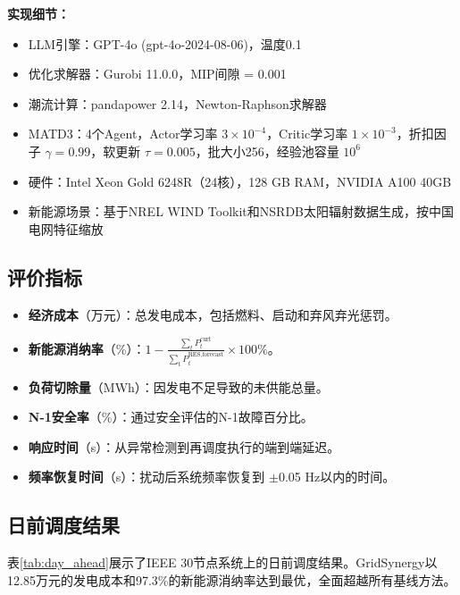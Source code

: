 \documentclass[conference]{IEEEtran}
\begin{document}
\textbf{实现细节：}
\begin{itemize}
    \item LLM引擎：GPT-4o (gpt-4o-2024-08-06)，温度0.1
    \item 优化求解器：Gurobi 11.0.0，MIP间隙 = 0.001
    \item 潮流计算：pandapower 2.14，Newton-Raphson求解器
    \item MATD3：4个Agent，Actor学习率 $3\times 10^{-4}$，Critic学习率 $1\times 10^{-3}$，折扣因子 $\gamma = 0.99$，软更新 $\tau = 0.005$，批大小256，经验池容量 $10^6$
    \item 硬件：Intel Xeon Gold 6248R（24核），128 GB RAM，NVIDIA A100 40GB
    \item 新能源场景：基于NREL WIND Toolkit和NSRDB太阳辐射数据生成，按中国电网特征缩放
\end{itemize}

\subsection{评价指标}

\begin{itemize}
    \item \textbf{经济成本}（万元）：总发电成本，包括燃料、启动和弃风弃光惩罚。
    \item \textbf{新能源消纳率}（\%）：$1 - \frac{\sum_t P_t^{\text{curt}}}{\sum_t P_t^{\text{RES},\text{forecast}}} \times 100\%$。
    \item \textbf{负荷切除量}（MWh）：因发电不足导致的未供能总量。
    \item \textbf{N-1安全率}（\%）：通过安全评估的N-1故障百分比。
    \item \textbf{响应时间}（s）：从异常检测到再调度执行的端到端延迟。
    \item \textbf{频率恢复时间}（s）：扰动后系统频率恢复到 $\pm$0.05 Hz以内的时间。
\end{itemize}

\subsection{日前调度结果}

表\ref{tab:day_ahead}展示了IEEE 30节点系统上的日前调度结果。GridSynergy以12.85万元的发电成本和97.3\%的新能源消纳率达到最优，全面超越所有基线方法。
\end{document}

